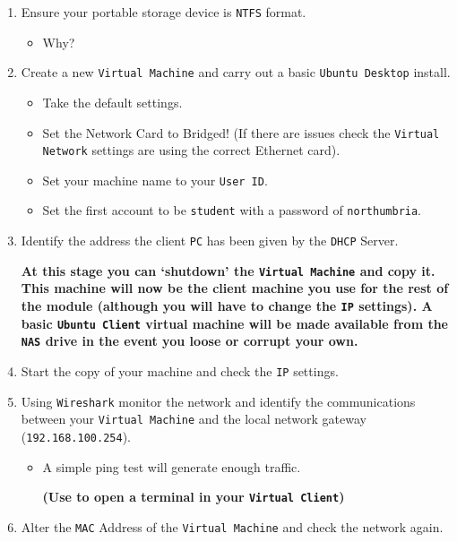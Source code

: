 \documentclass[11pt]{article}
\begin{document}
\begin{enumerate}

\item Ensure your portable storage device is \texttt{NTFS} format.
\begin{itemize}
    \item Why?
\end{itemize} 

\item Create a new \texttt{Virtual Machine} and carry out a basic \texttt{Ubuntu Desktop} install.
\begin{itemize}
    \item Take the default settings.
    \item Set the Network Card to Bridged! (If there are issues check the \texttt{Virtual Network} settings are using the correct Ethernet card).
    \item Set your machine name to your \texttt{User ID}.    
    \item Set the first account to be \texttt{student} with a password of \texttt{northumbria}.    
\end{itemize}

\item Identify the address the client \texttt{PC} has been given by the \texttt{DHCP} Server.
\begin{tcolorbox}[colback=blue!20]
    \textbf{At this stage you can `shutdown' the \texttt{Virtual Machine} and copy it. This machine will now be the client machine you use for the rest of the module (although you will have to change the \texttt{IP} settings). A basic \texttt{Ubuntu Client} virtual machine will be made available from the \texttt{NAS} drive in the event you loose or corrupt your own.}
\end{tcolorbox}

\item Start the copy of your machine and check the \texttt{IP} settings.

\item Using \texttt{Wireshark} monitor the network and identify the communications between your \texttt{Virtual Machine} and the local network gateway (\texttt{192.168.100.254}).
    \begin{itemize}
        \item A simple ping test will generate enough traffic. 
        \begin{tcolorbox}[colback=blue!20]
            \textbf{(Use  to open a terminal in your \texttt{Virtual Client})}
        \end{tcolorbox}
    \end{itemize}

\item Alter the \texttt{MAC} Address of the \texttt{Virtual Machine} and check the network again.

\end{enumerate}
\end{document}
